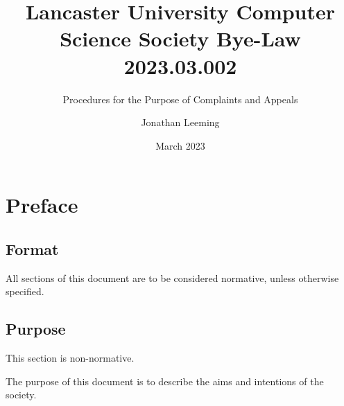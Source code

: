 \documentclass{scrartcl}
\title{Lancaster University Computer Science Society Bye-Law 2023.03.002}
\subtitle{Procedures for the Purpose of Complaints and Appeals}
\author{Jonathan Leeming}
\date{March 2023}
\begin{document}
    \maketitle
    
    \clearpage
    \tableofcontents

    \clearpage
    \section{Preface}
        \label{preface}
        \subsection{Format}
            \label{preface--format}
            All sections of this document are to be considered normative, unless otherwise specified.

        \subsection{Purpose}
            \label{preface--purpose}
            This section is non-normative.

            The purpose of this document is to describe the aims and intentions of the society.

    \clearpage
\end{document}
